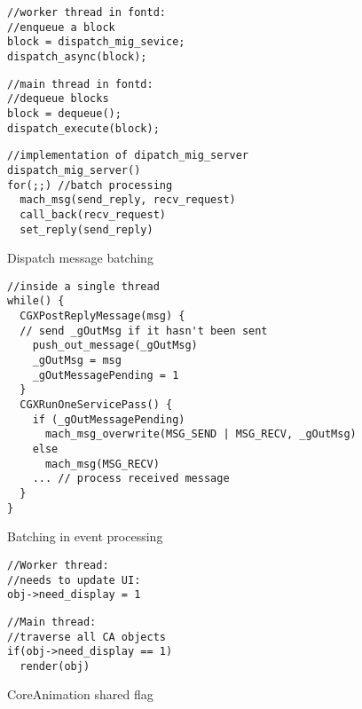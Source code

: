 \begin{figure}[t]
\begin{minipage}[t]{.25\textwidth}
\begin{lstlisting}
//worker thread in fontd:
//enqueue a block
block = dispatch_mig_sevice;
dispatch_async(block);
\end{lstlisting}
\end{minipage}\hfill
\begin{minipage}[t]{.21\textwidth}
\begin{lstlisting}
//main thread in fontd:
//dequeue blocks
block = dequeue();
dispatch_execute(block);
\end{lstlisting}
\end{minipage}

\begin{minipage}[t]{0.48\textwidth}
\begin{lstlisting}
//implementation of dipatch_mig_server
dispatch_mig_server()
for(;;) //batch processing
  mach_msg(send_reply, recv_request)
  call_back(recv_request)
  set_reply(send_reply)
\end{lstlisting}
\end{minipage}
    \caption{Dispatch message batching}
    \label{fig:dispatchmessagebatching}
\end{figure}

\begin{figure}[t]
\begin{lstlisting}
//inside a single thread
while() {
  CGXPostReplyMessage(msg) {
  // send _gOutMsg if it hasn't been sent
    push_out_message(_gOutMsg)
    _gOutMsg = msg
    _gOutMessagePending = 1
  }
  CGXRunOneServicePass() {
    if (_gOutMessagePending)
      mach_msg_overwrite(MSG_SEND | MSG_RECV, _gOutMsg)
    else
      mach_msg(MSG_RECV)
    ... // process received message
  }
}
\end{lstlisting}
    \caption{Batching in event processing}
    \label{fig:batchingineventprocessing}
\end{figure}

\begin{figure}[t!]
\begin{minipage}[t]{.20\textwidth}
\begin{lstlisting}
//Worker thread:
//needs to update UI:
obj->need_display = 1
\end{lstlisting}\hfill
\end{minipage}
\noindent\begin{minipage}[t]{.25\textwidth}
\begin{lstlisting}
//Main thread: 
//traverse all CA objects
if(obj->need_display == 1)
  render(obj)
\end{lstlisting}\hfill
\end{minipage}
    \caption{CoreAnimation shared flag}
    \label{fig:casharedflag}
\end{figure}

